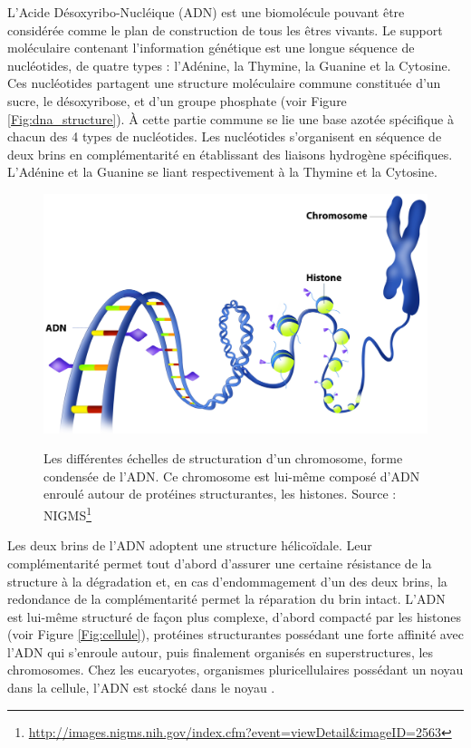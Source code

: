 L'Acide Désoxyribo-Nucléique (ADN) est une biomolécule pouvant être considérée comme le plan de construction de tous les êtres vivants. Le support moléculaire contenant l'information génétique est une longue séquence de nucléotides, de quatre types : l'Adénine, la Thymine, la Guanine et la Cytosine. Ces nucléotides partagent une structure moléculaire commune constituée d'un sucre, le désoxyribose, et d'un groupe phosphate (voir Figure \ref{Fig:dna_structure}). À cette partie commune se lie une base azotée spécifique à chacun des 4 types de nucléotides. Les nucléotides s'organisent en séquence de deux brins en complémentarité en établissant des liaisons hydrogène spécifiques. L'Adénine et la Guanine se liant respectivement à la Thymine et la Cytosine.

\begin{figure}[htb]
 \centering
 {\includegraphics[width=0.6\linewidth]{./figures/ch1/chromosome_adn_horizontal.pdf}}
   \caption[Echelles de structuration du chromosome à l'ADN]{Les différentes échelles de structuration d'un chromosome, forme condensée de l'ADN. Ce chromosome est lui-même composé d'ADN enroulé autour de protéines structurantes, les histones. Source : NIGMS\footnote{\url{http://images.nigms.nih.gov/index.cfm?event=viewDetail&imageID=2563}}}
   \label{Fig:chromosome_adn_2}
  \hspace{0.2cm}
\end{figure}

Les deux brins de l'ADN adoptent une structure hélicoïdale. Leur complémentarité permet tout d'abord d'assurer une certaine résistance de la structure à la dégradation et, en cas d'endommagement d'un des deux brins, la redondance de la complémentarité permet la réparation du brin intact.
L'ADN est lui-même structuré de façon plus complexe, d'abord compacté par les histones (voir Figure \ref{Fig:cellule}), protéines structurantes possédant une forte affinité avec l'ADN qui s'enroule autour, puis finalement organisés en superstructures, les chromosomes. 
Chez les eucaryotes, organismes pluricellulaires possédant un noyau dans la cellule, l'ADN est stocké dans le noyau \cite{johnson2011biologie}. 


